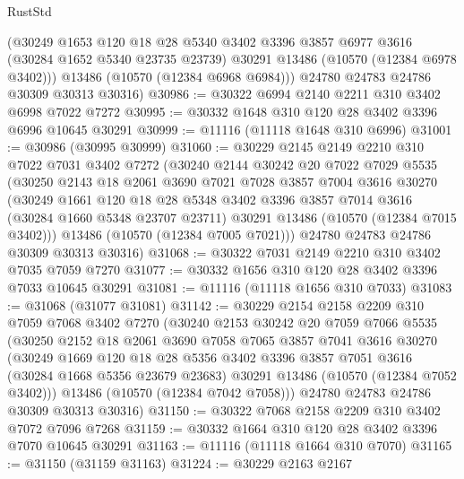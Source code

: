 \begin{lexlean}{RustStd}
\begin{coremodule}
        (@30249
          @1653
          @120
          @18
          @28
          @5340
          @3402
          @3396
          @3857
          @6977
          @3616
          (@30284 @1652 @5340 @23735 @23739)
          @30291
          @13486
          (@10570 (@12384 @6978 @3402)))
        @13486
        (@10570 (@12384 @6968 @6984)))
      @24780
      @24783
      @24786
      @30309
      @30313
      @30316)
@30986 := @30322 @6994 @2140 @2211 @310 @3402 @6998 @7022 @7272
@30995 := @30332 @1648 @310 @120 @28 @3402 @3396 @6996 @10645 @30291
@30999 := @11116 (@11118 @1648 @310 @6996)
@31001 := @30986 (@30995 @30999)
@31060 := @30229
    @2145
    @2149
    @2210
    @310
    @7022
    @7031
    @3402
    @7272
    (@30240
      @2144
      @30242
      @20
      @7022
      @7029
      @5535
      (@30250
        @2143
        @18
        @2061
        @3690
        @7021
        @7028
        @3857
        @7004
        @3616
        @30270
        (@30249
          @1661
          @120
          @18
          @28
          @5348
          @3402
          @3396
          @3857
          @7014
          @3616
          (@30284 @1660 @5348 @23707 @23711)
          @30291
          @13486
          (@10570 (@12384 @7015 @3402)))
        @13486
        (@10570 (@12384 @7005 @7021)))
      @24780
      @24783
      @24786
      @30309
      @30313
      @30316)
@31068 := @30322 @7031 @2149 @2210 @310 @3402 @7035 @7059 @7270
@31077 := @30332 @1656 @310 @120 @28 @3402 @3396 @7033 @10645 @30291
@31081 := @11116 (@11118 @1656 @310 @7033)
@31083 := @31068 (@31077 @31081)
@31142 := @30229
    @2154
    @2158
    @2209
    @310
    @7059
    @7068
    @3402
    @7270
    (@30240
      @2153
      @30242
      @20
      @7059
      @7066
      @5535
      (@30250
        @2152
        @18
        @2061
        @3690
        @7058
        @7065
        @3857
        @7041
        @3616
        @30270
        (@30249
          @1669
          @120
          @18
          @28
          @5356
          @3402
          @3396
          @3857
          @7051
          @3616
          (@30284 @1668 @5356 @23679 @23683)
          @30291
          @13486
          (@10570 (@12384 @7052 @3402)))
        @13486
        (@10570 (@12384 @7042 @7058)))
      @24780
      @24783
      @24786
      @30309
      @30313
      @30316)
@31150 := @30322 @7068 @2158 @2209 @310 @3402 @7072 @7096 @7268
@31159 := @30332 @1664 @310 @120 @28 @3402 @3396 @7070 @10645 @30291
@31163 := @11116 (@11118 @1664 @310 @7070)
@31165 := @31150 (@31159 @31163)
@31224 := @30229
    @2163
    @2167

\end{coremodule}
\end{lexlean}
